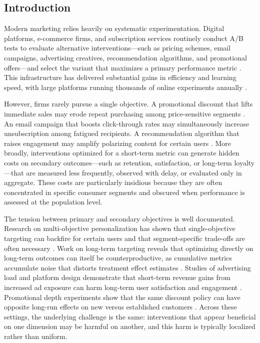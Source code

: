 \documentclass[11pt,letterpaper,english]{article}
\theoremstyle{definition}
\theoremstyle{definition}
\begin{document}
\begin{bibunit}
\newpage
\section{Introduction}
\label{sec:intro}

Modern marketing relies heavily on systematic experimentation. Digital platforms, e-commerce firms, and subscription services routinely conduct A/B tests to evaluate alternative interventions---such as pricing schemes, email campaigns, advertising creatives, recommendation algorithms, and promotional offers---and select the variant that maximizes a primary performance metric \citep{kohavi2012trustworthy, kohavi2009controlled}. This infrastructure has delivered substantial gains in efficiency and learning speed, with large platforms running thousands of online experiments annually \citep{kohavi2012trustworthy}.

However, firms rarely pursue a single objective. A promotional discount that lifts immediate sales may erode repeat purchasing among price-sensitive segments \citep{anderson2004longrun}. An email campaign that boosts click-through rates may simultaneously increase unsubscription among fatigued recipients. A recommendation algorithm that raises engagement may amplify polarizing content for certain users \citep{guess2023social}. More broadly, interventions optimized for a short-term metric can generate hidden costs on secondary outcomes---such as retention, satisfaction, or long-term loyalty---that are measured less frequently, observed with delay, or evaluated only in aggregate. These costs are particularly insidious because they are often concentrated in specific consumer segments and obscured when performance is assessed at the population level.

The tension between primary and secondary objectives is well documented. Research on multi-objective personalization has shown that single-objective targeting can backfire for certain users and that segment-specific trade-offs are often necessary \citep{rafieian2025multiobjective}. Work on long-term targeting reveals that optimizing directly on long-term outcomes can itself be counterproductive, as cumulative metrics accumulate noise that distorts treatment effect estimates \citep{ascarza2024doingmore}. Studies of advertising load and platform design demonstrate that short-term revenue gains from increased ad exposure can harm long-term user satisfaction and engagement \citep{hohnhold2015focusing, goli2025personalizing}. Promotional depth experiments show that the same discount policy can have opposite long-run effects on new versus established customers \citep{anderson2004longrun}. Across these settings, the underlying challenge is the same: interventions that appear beneficial on one dimension may be harmful on another, and this harm is typically localized rather than uniform.


\end{bibunit}
\end{document}
